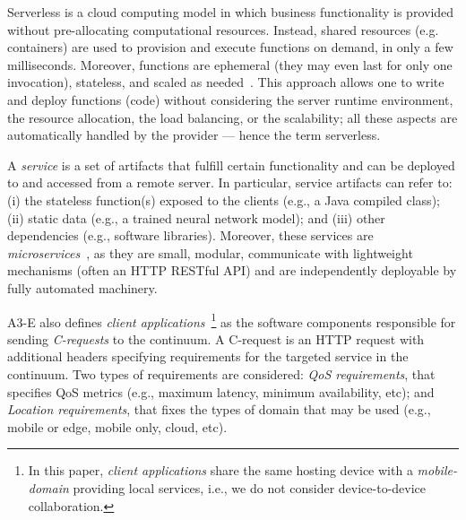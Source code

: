 Serverless is a cloud computing model in which business functionality is provided without pre-allocating computational resources. Instead, shared resources (e.g. containers) are used to provision and execute functions on demand, in only a few milliseconds. Moreover, functions are ephemeral (they may even last for only one invocation), stateless, and scaled as needed~\cite{Roberts:2016}. This approach allows one to write and deploy functions (code) without considering the server runtime environment, the resource allocation, the load balancing, or the scalability; all these aspects are automatically handled by the provider --- hence the term serverless.

A \textit{service} is a set of artifacts that fulfill certain functionality and can be deployed to and accessed from a remote server. In particular, service artifacts can refer to: (i) the stateless function(s) exposed to the clients (e.g., a Java compiled class); (ii) static data (e.g., a trained neural network model); and (iii) other dependencies (e.g.,  software libraries). Moreover, these services are \textit{microservices}~\cite{lewis2014microservices}, as they are small, modular, communicate with lightweight mechanisms (often an HTTP RESTful API) and are independently deployable by fully automated machinery. 

A3-E also defines \textit{client applications}~\footnote{In this paper, \textit{client applications} share the same hosting device with a \textit{mobile-domain} providing local services, i.e., we do not consider device-to-device collaboration.} as the software components responsible for sending \textit{C-requests} to the continuum. A C-request is an HTTP request with additional headers specifying requirements for the targeted service in the continuum. Two types of requirements are considered: \textit{QoS requirements}, that specifies QoS metrics (e.g., maximum latency, minimum availability, etc); and \textit{Location requirements}, that fixes the types of domain that may be used (e.g., mobile or edge, mobile only, cloud, etc). 


